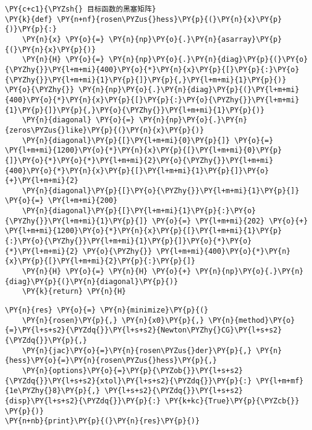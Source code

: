     \begin{tcolorbox}[breakable, size=fbox, boxrule=1pt, pad at break*=1mm,colback=cellbackground, colframe=cellborder]
\begin{Verbatim}[commandchars=\\\{\}]
\PY{c+c1}{\PYZsh{} 目标函数的黑塞矩阵}
\PY{k}{def} \PY{n+nf}{rosen\PYZus{}hess}\PY{p}{(}\PY{n}{x}\PY{p}{)}\PY{p}{:}
    \PY{n}{x} \PY{o}{=} \PY{n}{np}\PY{o}{.}\PY{n}{asarray}\PY{p}{(}\PY{n}{x}\PY{p}{)}
    \PY{n}{H} \PY{o}{=} \PY{n}{np}\PY{o}{.}\PY{n}{diag}\PY{p}{(}\PY{o}{\PYZhy{}}\PY{l+m+mi}{400}\PY{o}{*}\PY{n}{x}\PY{p}{[}\PY{p}{:}\PY{o}{\PYZhy{}}\PY{l+m+mi}{1}\PY{p}{]}\PY{p}{,}\PY{l+m+mi}{1}\PY{p}{)} \PY{o}{\PYZhy{}} \PY{n}{np}\PY{o}{.}\PY{n}{diag}\PY{p}{(}\PY{l+m+mi}{400}\PY{o}{*}\PY{n}{x}\PY{p}{[}\PY{p}{:}\PY{o}{\PYZhy{}}\PY{l+m+mi}{1}\PY{p}{]}\PY{p}{,}\PY{o}{\PYZhy{}}\PY{l+m+mi}{1}\PY{p}{)}
    \PY{n}{diagonal} \PY{o}{=} \PY{n}{np}\PY{o}{.}\PY{n}{zeros\PYZus{}like}\PY{p}{(}\PY{n}{x}\PY{p}{)}
    \PY{n}{diagonal}\PY{p}{[}\PY{l+m+mi}{0}\PY{p}{]} \PY{o}{=} \PY{l+m+mi}{1200}\PY{o}{*}\PY{n}{x}\PY{p}{[}\PY{l+m+mi}{0}\PY{p}{]}\PY{o}{*}\PY{o}{*}\PY{l+m+mi}{2}\PY{o}{\PYZhy{}}\PY{l+m+mi}{400}\PY{o}{*}\PY{n}{x}\PY{p}{[}\PY{l+m+mi}{1}\PY{p}{]}\PY{o}{+}\PY{l+m+mi}{2}
    \PY{n}{diagonal}\PY{p}{[}\PY{o}{\PYZhy{}}\PY{l+m+mi}{1}\PY{p}{]} \PY{o}{=} \PY{l+m+mi}{200}
    \PY{n}{diagonal}\PY{p}{[}\PY{l+m+mi}{1}\PY{p}{:}\PY{o}{\PYZhy{}}\PY{l+m+mi}{1}\PY{p}{]} \PY{o}{=} \PY{l+m+mi}{202} \PY{o}{+} \PY{l+m+mi}{1200}\PY{o}{*}\PY{n}{x}\PY{p}{[}\PY{l+m+mi}{1}\PY{p}{:}\PY{o}{\PYZhy{}}\PY{l+m+mi}{1}\PY{p}{]}\PY{o}{*}\PY{o}{*}\PY{l+m+mi}{2} \PY{o}{\PYZhy{}} \PY{l+m+mi}{400}\PY{o}{*}\PY{n}{x}\PY{p}{[}\PY{l+m+mi}{2}\PY{p}{:}\PY{p}{]}
    \PY{n}{H} \PY{o}{=} \PY{n}{H} \PY{o}{+} \PY{n}{np}\PY{o}{.}\PY{n}{diag}\PY{p}{(}\PY{n}{diagonal}\PY{p}{)}
    \PY{k}{return} \PY{n}{H}
\end{Verbatim}
\end{tcolorbox}

    \begin{tcolorbox}[breakable, size=fbox, boxrule=1pt, pad at break*=1mm,colback=cellbackground, colframe=cellborder]
\begin{Verbatim}[commandchars=\\\{\}]
\PY{n}{res} \PY{o}{=} \PY{n}{minimize}\PY{p}{(}
    \PY{n}{rosen}\PY{p}{,} \PY{n}{x0}\PY{p}{,} \PY{n}{method}\PY{o}{=}\PY{l+s+s2}{\PYZdq{}}\PY{l+s+s2}{Newton\PYZhy{}CG}\PY{l+s+s2}{\PYZdq{}}\PY{p}{,}
    \PY{n}{jac}\PY{o}{=}\PY{n}{rosen\PYZus{}der}\PY{p}{,} \PY{n}{hess}\PY{o}{=}\PY{n}{rosen\PYZus{}hess}\PY{p}{,}
    \PY{n}{options}\PY{o}{=}\PY{p}{\PYZob{}}\PY{l+s+s2}{\PYZdq{}}\PY{l+s+s2}{xtol}\PY{l+s+s2}{\PYZdq{}}\PY{p}{:} \PY{l+m+mf}{1e\PYZhy{}8}\PY{p}{,} \PY{l+s+s2}{\PYZdq{}}\PY{l+s+s2}{disp}\PY{l+s+s2}{\PYZdq{}}\PY{p}{:} \PY{k+kc}{True}\PY{p}{\PYZcb{}}
\PY{p}{)}
\PY{n+nb}{print}\PY{p}{(}\PY{n}{res}\PY{p}{)}
\end{Verbatim}
\end{tcolorbox}

